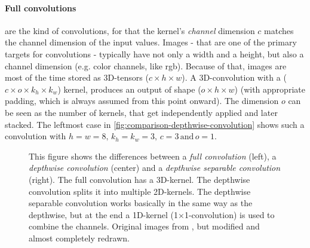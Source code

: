 \paragraph{Full convolutions} are the kind of convolutions, for that the kernel's \emph{channel} dimension $c$ matches the channel dimension of the input values.
Images - that are one of the primary targets for convolutions - typically have not only a width and a height, but also a channel dimension (e.g. color channels, like rgb).
Because of that, images are most of the time stored as 3D-tensors ($c \times h \times w$).
A 3D-convolution with a ($c \times o \times k_h \times k_w$) kernel, produces an output of shape ($o \times h \times w$) (with appropriate padding, which is always assumed from this point onward).
The dimension $o$ can be seen as the number of kernels, that get independently applied and later stacked.
The leftmost case in \autoref{fig:comparison-depthwise-convolution} shows such a convolution with $h = w=8,\, k_h =k_w = 3,\, c = 3 \mathrm{\,and\,} o=1$.

\begin{figure}[htbp]
    \centering
    \caption{This figure shows the differences between a \emph{full convolution} (left), a \emph{depthwise convolution}  (center) and a \emph{depthwise separable convolution} (right).
    The full convolution has a 3D-kernel. 
    The depthwise convolution splits it into multiple 2D-kernels.
    The depthwise separable convolution works basically in the same way as the depthwise, but at the end a 1D-kernel (1$\times$1-convolution) is used to combine the channels.
     Original images from \cite{separableConvolutions}, but modified and almost completely redrawn.}
    \label{fig:comparison-depthwise-convolution}
\end{figure}

